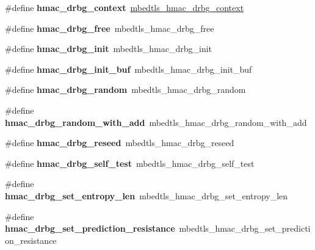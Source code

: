 \begin{DoxyCompactItemize}
\#define {\bfseries hmac\+\_\+drbg\+\_\+context}~\mbox{\hyperlink{structmbedtls__hmac__drbg__context}{mbedtls\+\_\+hmac\+\_\+drbg\+\_\+context}}
\item 
\mbox{\label{compat-1_83_8h_a89ce7caa4ec2a667eabf7725411cf571}} 
\#define {\bfseries hmac\+\_\+drbg\+\_\+free}~mbedtls\+\_\+hmac\+\_\+drbg\+\_\+free
\item 
\mbox{\label{compat-1_83_8h_ad7fd93442e5cc4a5838a34da2035580f}} 
\#define {\bfseries hmac\+\_\+drbg\+\_\+init}~mbedtls\+\_\+hmac\+\_\+drbg\+\_\+init
\item 
\mbox{\label{compat-1_83_8h_a9ce3b346130833e98ec88489360ee812}} 
\#define {\bfseries hmac\+\_\+drbg\+\_\+init\+\_\+buf}~mbedtls\+\_\+hmac\+\_\+drbg\+\_\+init\+\_\+buf
\item 
\mbox{\label{compat-1_83_8h_a8359cbb0be9ba5e40fb08ed26e0002d1}} 
\#define {\bfseries hmac\+\_\+drbg\+\_\+random}~mbedtls\+\_\+hmac\+\_\+drbg\+\_\+random
\item 
\mbox{\label{compat-1_83_8h_a2d4ed9853285bcfe6c4edcde0f9539b2}} 
\#define {\bfseries hmac\+\_\+drbg\+\_\+random\+\_\+with\+\_\+add}~mbedtls\+\_\+hmac\+\_\+drbg\+\_\+random\+\_\+with\+\_\+add
\item 
\mbox{\label{compat-1_83_8h_aaecb40e8b200bb1ff9583adc5171fdea}} 
\#define {\bfseries hmac\+\_\+drbg\+\_\+reseed}~mbedtls\+\_\+hmac\+\_\+drbg\+\_\+reseed
\item 
\mbox{\label{compat-1_83_8h_aa15d07d636a9cac05487b865434399a6}} 
\#define {\bfseries hmac\+\_\+drbg\+\_\+self\+\_\+test}~mbedtls\+\_\+hmac\+\_\+drbg\+\_\+self\+\_\+test
\item 
\mbox{\label{compat-1_83_8h_a20a7744da9ec324bf1cf6b87eedb8b91}} 
\#define {\bfseries hmac\+\_\+drbg\+\_\+set\+\_\+entropy\+\_\+len}~mbedtls\+\_\+hmac\+\_\+drbg\+\_\+set\+\_\+entropy\+\_\+len
\item 
\mbox{\label{compat-1_83_8h_ac6ead7e76deb1292991020a1589e3dac}} 
\#define {\bfseries hmac\+\_\+drbg\+\_\+set\+\_\+prediction\+\_\+resistance}~mbedtls\+\_\+hmac\+\_\+drbg\+\_\+set\+\_\+prediction\+\_\+resistance

\end{DoxyCompactItemize}
